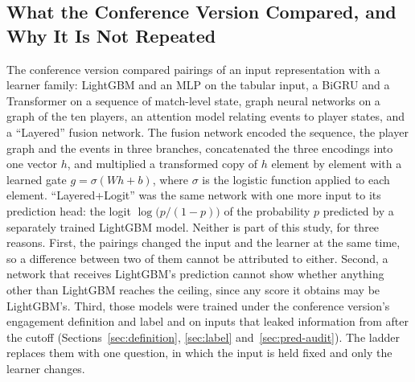 \subsection{What the Conference Version Compared, and Why It Is Not Repeated}
\label{sec:learners-cog}

The conference version compared pairings of an input representation with a learner family: LightGBM and
an MLP on the tabular input, a BiGRU and a Transformer on a sequence of match-level state, graph neural
networks on a graph of the ten players, an attention model relating events to player states, and a
``Layered'' fusion network. The fusion network encoded the sequence, the player graph and the events in
three branches, concatenated the three encodings into one vector $h$, and multiplied a transformed copy of
$h$ element by element with a learned gate $g = \sigma(W h + b)$, where $\sigma$ is the logistic function
applied to each element. ``Layered+Logit'' was the same network with one more input to its prediction
head: the logit $\log\bigl(p/(1-p)\bigr)$ of the probability $p$ predicted by a separately trained
LightGBM model. Neither is part of this study, for three reasons. First, the pairings changed the input
and the learner at the same time, so a difference between two of them cannot be attributed to either.
Second, a network that receives LightGBM's prediction cannot show whether anything other than LightGBM
reaches the ceiling, since any score it obtains may be LightGBM's. Third, those models were trained under
the conference version's engagement definition and label and on inputs that leaked information from after
the cutoff (Sections~\ref{sec:definition}, \ref{sec:label} and~\ref{sec:pred-audit}). The ladder replaces
them with one question, in which the input is held fixed and only the learner changes.


